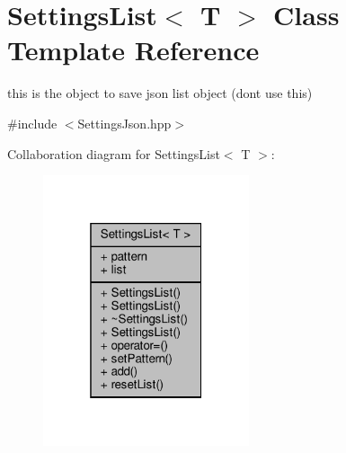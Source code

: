 \hypertarget{class_settings_list}{}\section{Settings\+List$<$ T $>$ Class Template Reference}
\label{class_settings_list}


this is the object to save json list object (dont use this)  




{\ttfamily \#include $<$Settings\+Json.\+hpp$>$}



Collaboration diagram for Settings\+List$<$ T $>$\+:
\nopagebreak
\begin{figure}[H]
\begin{center}
\leavevmode
\includegraphics[width=172pt]{class_settings_list__coll__graph}
\end{center}
\end{figure}
